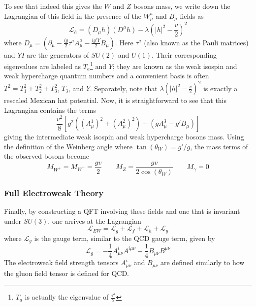To see that indeed this gives the $W$ and $Z$ bosons mass, we write down the Lagrangian of this field in the presence of the $W^a_\mu$ and $B_\mu$ fields as
\begin{equation}
\mathcal{L}_{h} = (D_{\mu}h)(D^\mu h) - \lambda\left(|h|^2- \frac{v}{2}\right)^2
\label{eq:higg-field-lagrangian}
\end{equation}
where $D_\mu = (\partial_\mu - \frac{ig}{2}\tau^a A^a_\mu - \frac{ig'Y}{2}B_\mu)$. Here $\tau^a$ (also known as the Pauli matrices) and $YI$ are the generators of $SU(2)$ and $U(1)$. Their corresponding eigenvalues are labeled as $T_a$\footnote{$T_a$ is actually the eigenvalue of $\frac{\tau^a}{2}$} and $Y$; they are known as the weak isospin and weak hypercharge quantum numbers and a convenient basis is often $T^2 = T_1^2 + T_2^2 + T_3^2$, $T_3$, and $Y$. Separately, note that $\lambda\left(|h|^2- \frac{v}{2}\right)^2$ is exactly a rescaled Mexican hat potential. Now, it is straightforward to see that this Lagrangian contains the terms
\begin{equation}
\frac{v^2}{8}\left[g^2\left((A^{1}_{\mu})^2 + (A^{2}_{\mu})^2\right) + (gA_{\mu}^3 - g' B_{\mu})\right]
\end{equation}
giving the intermediate weak isospin and weak hypercharge bosons mass. Using the definition of the Weinberg angle where $\tan(\theta_W) = g'/g$, the mass terms of the observed bosons become
\begin{equation}
M_{W^+} = M_{W^-} = \frac{gv}{2} \quad\quad M_{Z} = \frac{gv}{2\cos(\theta_{W})} \quad\quad M_{\gamma} = 0
\end{equation}

\subsubsection{Full Electroweak Theory}

Finally, by constructing a QFT involving these fields and one that is invariant under $SU(3)$, one arrives at the Lagrangian
\begin{equation}
\mathcal{L}_{EW} = \mathcal{L}_{g} + \mathcal{L}_{f} + \mathcal{L}_{h} + \mathcal{L}_{y}
\end{equation}
where $\mathcal{L}_g$ is the gauge term, similar to the QCD gauge term, given by
\begin{equation}
\mathcal{L}_g = -\frac{1}{4}A^i_{\mu\nu}A^{i\mu\nu} - \frac{1}{4} B_{\mu\nu} B^{\mu\nu}
\end{equation}
The electroweak field strength tensors $A^i_{\mu\nu}$ and $B_{\mu\nu}$ are defined similarly to how the gluon field tensor is defined for QCD.

